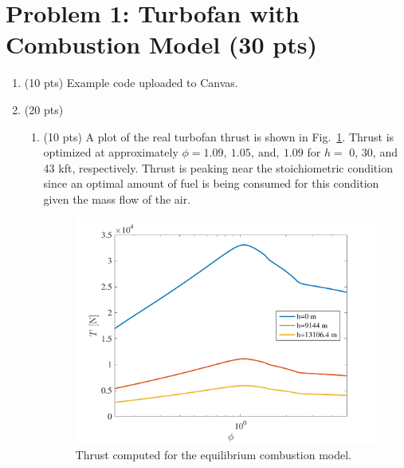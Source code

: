 \documentclass[12pt]{article}
\begin{document}
\begin{titlepage}
\vfill %

\end{titlepage}


\section{Problem 1: Turbofan with Combustion Model (30 pts)}
	\begin{enumerate}[label=(\alph*)]
		\item (10 pts)
			Example code uploaded to Canvas.
		\item (20 pts)
			\begin{enumerate}[label=(\roman*)]
				\item (10 pts)
					A plot of the real turbofan thrust is shown in Fig.~\ref{FIG_1ptbi}. Thrust is optimized at approximately $\boxed{\phi=1.09,\ 1.05,\ \mathrm{and},\ 1.09}$ for $h=$ 0, 30, and 43 kft, respectively. Thrust is peaking near the stoichiometric condition since an optimal amount of fuel is being consumed for this condition given the mass flow of the air.
					\begin{figure}[!t!]
						\begin{center}
							\includegraphics[width=120mm]{problem1ptbi.pdf}
							\caption{\label{FIG_1ptbi} Thrust computed for the equilibrium combustion model.}
						\end{center}

\end{figure}
\end{enumerate}
\end{enumerate}
\end{document}
